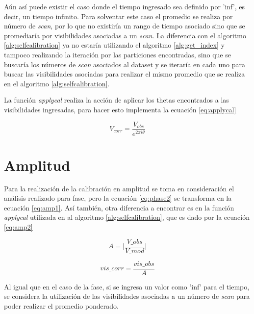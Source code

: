 Aún así puede existir el caso donde el tiempo ingresado sea definido por 'inf', es decir, un tiempo infinito. Para solventar este caso el promedio se realiza por número de \textit{scan}, por lo que no existiría un rango de tiempo asociado sino que se promediaría por visibilidades asociadas a un \textit{scan}. La diferencia con el algoritmo \ref{alg:selfcalibration} ya no estaría utilizando el algoritmo \ref{alg:get_index} y tampoco realizando la iteración por las particiones encontradas, sino que se buscaría los números de \textit{scan} asociados al dataset y se iteraría en cada uno para buscar las visibilidades asociadas para realizar el mismo promedio que se realiza en el algoritmo \ref{alg:selfcalibration}.



La función \textit{applycal} realiza la acción de aplicar los thetas encontrados a las visibilidades ingresadas, para hacer esto implementa la ecuación \ref{eq:applycal}

\begin{equation}
    V_{corr} = \frac{V_{obs}}{e^{2 \pi i \theta}}
    \label{eq:applycal}
\end{equation}

\section{Amplitud}

Para la realización de la calibración en amplitud se toma en consideración el análisis realizado para fase, pero la ecuación \ref{eq:phase2} se transforma en la ecuación \ref{eq:amp1}. Así también, otra diferencia a encontrar es en la función \textit{applycal} utilizada en al algoritmo \ref{alg:selfcalibration}, que es dado por la ecuación \ref{eq:amp2}

\begin{equation}
    A = \bigg|\frac{V\_obs}{V\_mod}\bigg| 
    \label{eq:amp1}
\end{equation}

\begin{equation}
    vis\_corr = \frac{vis\_obs}{A}
    \label{eq:amp2}
\end{equation}

Al igual que en el caso de la fase, si se ingresa un valor como 'inf' para el tiempo, se considera la utilización de las visibilidades asociadas a un número de \textit{scan} para poder realizar el promedio ponderado. 


